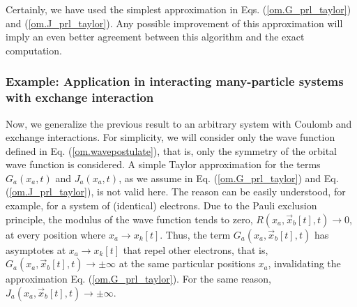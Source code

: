 \documentclass[nofootinbib, secnumarabic, amsmath, nobibnotes,11pt,aps,pra, floatfix]{revtex4-1}
\newcommand{\eref}[1]{Eq. (\ref{#1})}
\begin{document}
Certainly, we have used the simplest approximation in Eqs. (\ref{om.G_prl_taylor}) and (\ref{om.J_prl_taylor}). Any possible improvement of this approximation will imply an even better agreement between this algorithm and the exact computation.

\subsubsection{Example: Application in interacting many-particle systems with exchange interaction}

Now, we generalize the previous result to an arbitrary system with
Coulomb and exchange interactions. For simplicity, we will consider
only the wave function defined in \eref{om.wavepostulate}, that is,
only the symmetry of the orbital wave function is considered. A
simple Taylor approximation for the terms \textit{$G_{a}(x_a,t)$}
and \textit{$J_{a}(x_a,t)$}, as we assume in \eref{om.G_prl_taylor}
and \eref{om.J_prl_taylor}, is not valid here. The reason can be
easily understood, for example, for a system of (identical)
electrons. Due to the Pauli exclusion principle, the modulus of the
wave function tends to zero, $R({{x}_{a}},{{\vec{x}}_{b}}[t],t)\to
0$, at every position where ${{x}_{a}}\to {{x}_{k}}[t]$. Thus, the term
\textit{${{G}_{a}}({{x}_{a}},{{\vec{x}}_{b}}[t],t)$} has asymptotes
at ${{x}_{a}}\to {{x}_{k}}[t]$ that repel other electrons, that is,
${G}_{a}({{x}_{a}},{{\vec{x}}_{b}}[t],t) \to \pm \infty $ at the
same particular positions $x_a$, invalidating the approximation
\eref{om.G_prl_taylor}. For the same reason,
${J}_{a}({{x}_{a}},{{\vec{x}}_{b}}[t],t) \to \pm \infty $.
\end{document}
